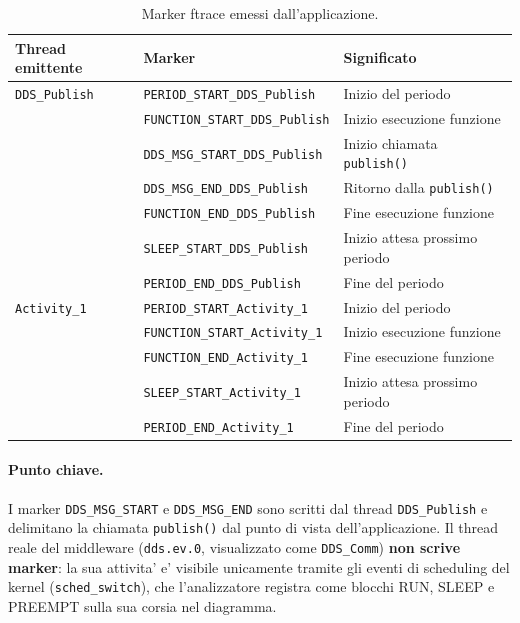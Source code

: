 \begin{table}[htbp]
\centering
\caption{Marker ftrace emessi dall'applicazione.}
\label{tab:marker}
\begin{tabular}{llp{6cm}}
\toprule
\textbf{Thread emittente} & \textbf{Marker} & \textbf{Significato} \\
\midrule
\texttt{DDS\_Publish} & \texttt{PERIOD\_START\_DDS\_Publish} & Inizio del periodo \\
                       & \texttt{FUNCTION\_START\_DDS\_Publish} & Inizio esecuzione funzione \\
                       & \texttt{DDS\_MSG\_START\_DDS\_Publish} & Inizio chiamata \texttt{publish()} \\
                       & \texttt{DDS\_MSG\_END\_DDS\_Publish} & Ritorno dalla \texttt{publish()} \\
                       & \texttt{FUNCTION\_END\_DDS\_Publish} & Fine esecuzione funzione \\
                       & \texttt{SLEEP\_START\_DDS\_Publish} & Inizio attesa prossimo periodo \\
                       & \texttt{PERIOD\_END\_DDS\_Publish} & Fine del periodo \\
\midrule
\texttt{Activity\_1}  & \texttt{PERIOD\_START\_Activity\_1} & Inizio del periodo \\
                       & \texttt{FUNCTION\_START\_Activity\_1} & Inizio esecuzione funzione \\
                       & \texttt{FUNCTION\_END\_Activity\_1} & Fine esecuzione funzione \\
                       & \texttt{SLEEP\_START\_Activity\_1} & Inizio attesa prossimo periodo \\
                       & \texttt{PERIOD\_END\_Activity\_1} & Fine del periodo \\
\bottomrule
\end{tabular}
\end{table}

\paragraph{Punto chiave.}
I marker \texttt{DDS\_MSG\_START} e \texttt{DDS\_MSG\_END} sono scritti
dal thread \texttt{DDS\_Publish} e delimitano la chiamata
\texttt{publish()} dal punto di vista dell'applicazione.
Il thread reale del middleware (\texttt{dds.ev.0}, visualizzato come
\texttt{DDS\_Comm}) \textbf{non scrive marker}: la sua attivita' e'
visibile unicamente tramite gli eventi di scheduling del kernel
(\texttt{sched\_switch}), che l'analizzatore registra come blocchi
RUN, SLEEP e PREEMPT sulla sua corsia nel diagramma.

